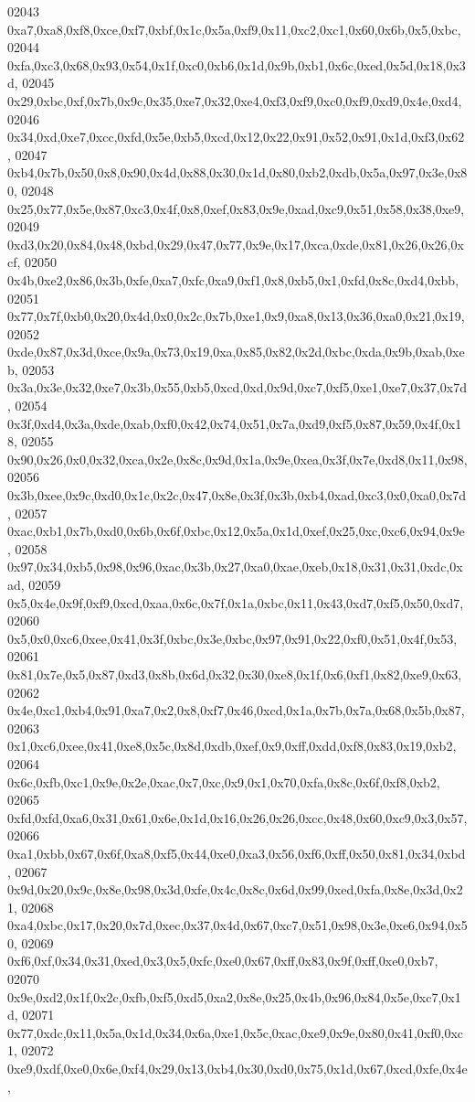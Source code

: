 \begin{DoxyCode}
02043   0xa7,0xa8,0xf8,0xce,0xf7,0xbf,0x1c,0x5a,0xf9,0x11,0xc2,0xc1,0x60,0x6b,0x5,0xbc,
02044   0xfa,0xc3,0x68,0x93,0x54,0x1f,0xc0,0xb6,0x1d,0x9b,0xb1,0x6c,0xed,0x5d,0x18,0x3d,
02045   0x29,0xbc,0xf,0x7b,0x9c,0x35,0xe7,0x32,0xe4,0xf3,0xf9,0xc0,0xf9,0xd9,0x4e,0xd4,
02046   0x34,0xd,0xe7,0xcc,0xfd,0x5e,0xb5,0xcd,0x12,0x22,0x91,0x52,0x91,0x1d,0xf3,0x62,
02047   0xb4,0x7b,0x50,0x8,0x90,0x4d,0x88,0x30,0x1d,0x80,0xb2,0xdb,0x5a,0x97,0x3e,0x80,
02048   0x25,0x77,0x5e,0x87,0xc3,0x4f,0x8,0xef,0x83,0x9e,0xad,0xc9,0x51,0x58,0x38,0xe9,
02049   0xd3,0x20,0x84,0x48,0xbd,0x29,0x47,0x77,0x9e,0x17,0xca,0xde,0x81,0x26,0x26,0xcf,
02050   0x4b,0xe2,0x86,0x3b,0xfe,0xa7,0xfc,0xa9,0xf1,0x8,0xb5,0x1,0xfd,0x8c,0xd4,0xbb,
02051   0x77,0x7f,0xb0,0x20,0x4d,0x0,0x2c,0x7b,0xe1,0x9,0xa8,0x13,0x36,0xa0,0x21,0x19,
02052   0xde,0x87,0x3d,0xce,0x9a,0x73,0x19,0xa,0x85,0x82,0x2d,0xbc,0xda,0x9b,0xab,0xeb,
02053   0x3a,0x3e,0x32,0xe7,0x3b,0x55,0xb5,0xcd,0xd,0x9d,0xc7,0xf5,0xe1,0xe7,0x37,0x7d,
02054   0x3f,0xd4,0x3a,0xde,0xab,0xf0,0x42,0x74,0x51,0x7a,0xd9,0xf5,0x87,0x59,0x4f,0x18,
02055   0x90,0x26,0x0,0x32,0xca,0x2e,0x8c,0x9d,0x1a,0x9e,0xea,0x3f,0x7e,0xd8,0x11,0x98,
02056   0x3b,0xee,0x9c,0xd0,0x1c,0x2c,0x47,0x8e,0x3f,0x3b,0xb4,0xad,0xc3,0x0,0xa0,0x7d,
02057   0xac,0xb1,0x7b,0xd0,0x6b,0x6f,0xbc,0x12,0x5a,0x1d,0xef,0x25,0xc,0xc6,0x94,0x9e,
02058   0x97,0x34,0xb5,0x98,0x96,0xac,0x3b,0x27,0xa0,0xae,0xeb,0x18,0x31,0x31,0xdc,0xad,
02059   0x5,0x4e,0x9f,0xf9,0xcd,0xaa,0x6c,0x7f,0x1a,0xbc,0x11,0x43,0xd7,0xf5,0x50,0xd7,
02060   0x5,0x0,0xc6,0xee,0x41,0x3f,0xbc,0x3e,0xbc,0x97,0x91,0x22,0xf0,0x51,0x4f,0x53,
02061   0x81,0x7e,0x5,0x87,0xd3,0x8b,0x6d,0x32,0x30,0xe8,0x1f,0x6,0xf1,0x82,0xe9,0x63,
02062   0x4e,0xc1,0xb4,0x91,0xa7,0x2,0x8,0xf7,0x46,0xcd,0x1a,0x7b,0x7a,0x68,0x5b,0x87,
02063   0x1,0xc6,0xee,0x41,0xe8,0x5c,0x8d,0xdb,0xef,0x9,0xff,0xdd,0xf8,0x83,0x19,0xb2,
02064   0x6c,0xfb,0xc1,0x9e,0x2e,0xac,0x7,0xc,0x9,0x1,0x70,0xfa,0x8c,0x6f,0xf8,0xb2,
02065   0xfd,0xfd,0xa6,0x31,0x61,0x6e,0x1d,0x16,0x26,0x26,0xcc,0x48,0x60,0xc9,0x3,0x57,
02066   0xa1,0xbb,0x67,0x6f,0xa8,0xf5,0x44,0xe0,0xa3,0x56,0xf6,0xff,0x50,0x81,0x34,0xbd,
02067   0x9d,0x20,0x9c,0x8e,0x98,0x3d,0xfe,0x4c,0x8c,0x6d,0x99,0xed,0xfa,0x8e,0x3d,0x21,
02068   0xa4,0xbc,0x17,0x20,0x7d,0xec,0x37,0x4d,0x67,0xc7,0x51,0x98,0x3e,0xe6,0x94,0x50,
02069   0xf6,0xf,0x34,0x31,0xed,0x3,0x5,0xfc,0xe0,0x67,0xff,0x83,0x9f,0xff,0xe0,0xb7,
02070   0x9e,0xd2,0x1f,0x2c,0xfb,0xf5,0xd5,0xa2,0x8e,0x25,0x4b,0x96,0x84,0x5e,0xc7,0x1d,
02071   0x77,0xdc,0x11,0x5a,0x1d,0x34,0x6a,0xe1,0x5c,0xac,0xe9,0x9e,0x80,0x41,0xf0,0xc1,
02072   0xe9,0xdf,0xe0,0x6e,0xf4,0x29,0x13,0xb4,0x30,0xd0,0x75,0x1d,0x67,0xcd,0xfe,0x4e,

\end{DoxyCode}
